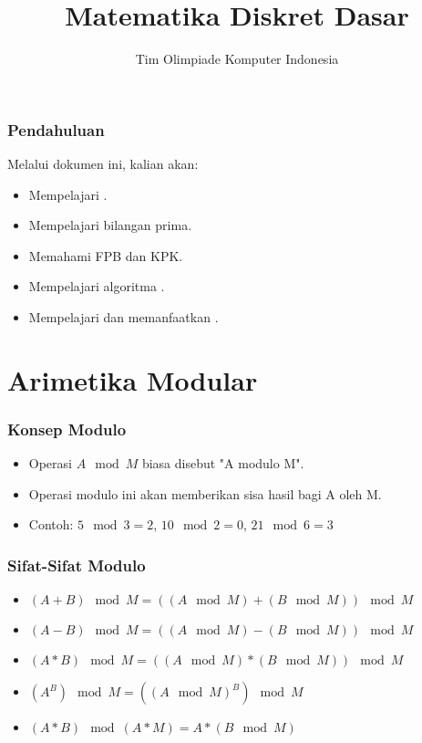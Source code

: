 

\title{Matematika Diskret Dasar}
\author{Tim Olimpiade Komputer Indonesia}
\date{}



\begin{frame}
\titlepage
\end{frame}

\begin{frame}
\frametitle{Pendahuluan}
Melalui dokumen ini, kalian akan:
\begin{itemize}
  \item Mempelajari .
  \item Mempelajari bilangan prima.
  \item Memahami FPB dan KPK.
  \item Mempelajari algoritma .
  \item Mempelajari dan memanfaatkan .
\end{itemize}
\end{frame}

\section{Arimetika Modular}
\frame{\sectionpage}

\begin{frame}
\frametitle{Konsep Modulo}
\begin{itemize}
  \item Operasi $A \mod M$ biasa disebut "A modulo M".
  \item Operasi modulo ini akan memberikan sisa hasil bagi A oleh M.
  \item Contoh: $5 \mod 3 = 2$, $10 \mod 2 = 0$, $21 \mod 6 = 3$
\end{itemize}
\end{frame}

\begin{frame}
\frametitle{Sifat-Sifat Modulo}
\begin{itemize}
  \item $(A + B) \mod M = ((A \mod M) + (B \mod M)) \mod M$
  \item $(A - B) \mod M = ((A \mod M) - (B \mod M)) \mod M$
  \item $(A * B) \mod M = ((A \mod M) * (B \mod M)) \mod M$  
  \item $(A^{B}) \mod M = ((A \mod M)^{B}) \mod M$
  \item $(A * B) \mod (A * M) = A * (B \mod M)$
\end{itemize}
\end{frame} 

